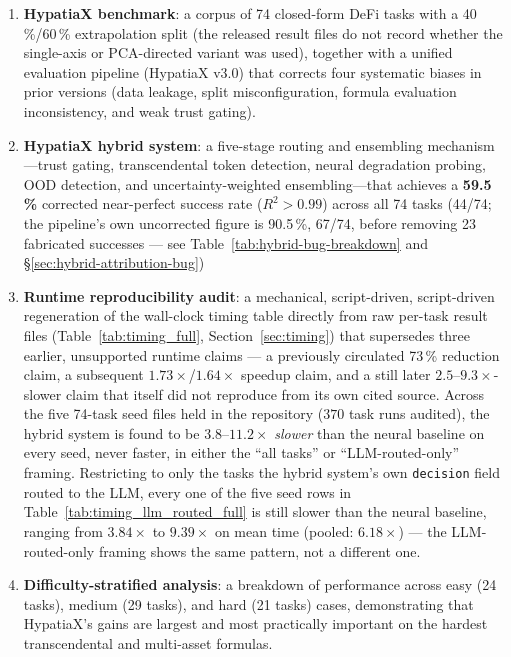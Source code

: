 \documentclass[twoside,11pt]{article}
\newcommand{\Rsq}{R^{2}}
\begin{document}
\begin{enumerate}[leftmargin=2em,label=(\roman*)]
  \item \textbf{HypatiaX benchmark}: a corpus of 74 closed-form DeFi tasks
    with a 40\,\%/60\,\% extrapolation split (the released result files do not record whether the single-axis or PCA-directed variant was used), together
    with a unified evaluation pipeline (HypatiaX v3.0) that corrects four
    systematic biases in prior versions (data leakage, split misconfiguration,
    formula evaluation inconsistency, and weak trust gating).

  \item \textbf{HypatiaX hybrid system}: a five-stage routing and ensembling
    mechanism---trust gating, transcendental token detection, neural degradation
    probing, OOD detection, and uncertainty-weighted ensembling---that achieves
    a \textbf{59.5\,\%} corrected near-perfect success rate ($\Rsq>0.99$) across
    all 74 tasks (44/74; the pipeline's own uncorrected figure is 90.5\,\%, 67/74,
    before removing 23 fabricated successes --- see Table~\ref{tab:hybrid-bug-breakdown}
    and \S\ref{sec:hybrid-attribution-bug})

  \item \textbf{Runtime reproducibility audit}: a mechanical, script-driven,
    script-driven regeneration of the wall-clock timing table
    directly from raw per-task result files (Table~\ref{tab:timing_full},
    Section~\ref{sec:timing}) that supersedes three earlier, unsupported
    runtime claims --- a previously circulated 73\,\% reduction claim, a
    subsequent $1.73\times$/$1.64\times$ speedup claim, and a still later
    $2.5$--$9.3\times$-slower claim that itself did not reproduce from its
    own cited source. Across the five 74-task seed files held in the
    repository ($370$ task runs audited), the hybrid
    system is found to be $3.8$--$11.2\times$ \emph{slower} than the neural
    baseline on every seed, never faster, in either the
    ``all tasks'' or ``LLM-routed-only'' framing. Restricting to only the
    tasks the hybrid system's own \texttt{decision} field routed to the LLM,
    every one of the five seed rows in Table~\ref{tab:timing_llm_routed_full}
    is still slower than the neural baseline, ranging from $3.84\times$ to
    $9.39\times$ on mean time (pooled: $6.18\times$)
    --- the LLM-routed-only framing shows the same pattern, not a different one.

  \item \textbf{Difficulty-stratified analysis}: a breakdown of performance across
    easy (24 tasks), medium (29 tasks), and hard (21 tasks) cases, demonstrating
    that HypatiaX's gains are largest and most practically important on the hardest
    transcendental and multi-asset formulas.
\end{enumerate}
\end{document}
